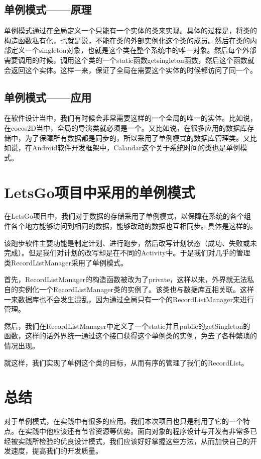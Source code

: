 \documentclass [a4paper,11pt]{article}
\begin{document}
\subsection{单例模式——原理}
单例模式通过在全局定义一个只能有一个实体的类来实现。具体的过程是，将类的构造函数私有化，也就是说，不能在类的外部实例化这个类的成员。然后在类的内部定义一个singleton对象，也就是这个类在整个系统中的唯一对象。然后每个外部需要调用的时候，调用这个类的一个static函数getsingleton函数，然后这个函数就会返回这个实体。这样一来，保证了全局在需要这个实体的时候都访问了同一个。
\subsection{单例模式——应用}
在软件设计当中，我们有时候会非常需要这样的一个全局的唯一的实体。比如说，在cocos2D当中，全局的导演类就必须是一个。又比如说，在很多应用的数据库存储中，为了保障所有数据都是同步的，所以采用了单例模式的数据库管理类。又比如说，在Android软件开发框架中，Calandar这个关于系统时间的类也是单例模式。

\section{LetsGo项目中采用的单例模式}
在LetsGo项目中，我们对于数据的存储采用了单例模式，以保障在系统的各个组件各个地方能够访问到相同的数据，能够改动的数据也互相同步。具体是这样的。

该跑步软件主要功能是制定计划、进行跑步，然后改写计划状态（成功、失败或未完成）。但是我们对计划的改写却是在不同的Activity中。于是我们对几乎的管理类RecordListManager采用了单例模式。

首先，RecordListManager的构造函数被改为了private，这样以来，外界就无法私自的实例化一个RecordListManager类的实例了。该类也与数据库互相关联。这样一来数据库也不会发生混乱，因为通过全局只有一个的RecordListManager来进行管理。

然后，我们在RecordListManager中定义了一个static并且public的getSingleton的函数，这样的话外界统一通过这个接口获得这个单例类的实例，免去了各种繁琐的情况出现。

就这样，我们实现了单例这个类的目标，从而有序的管理了我们的RecordList。

\section{总结}
对于单例模式，在实践中有很多的应用。我们本次项目也只是利用了它的一个特点。在实践中他应该还有节省资源等优势。面向对象的程序设计与开发有非常多已经被实践所检验的优良设计模式，我们应该好好掌握这些方法，从而加快自己的开发速度，提高我们的开发质量。
\end{document}

